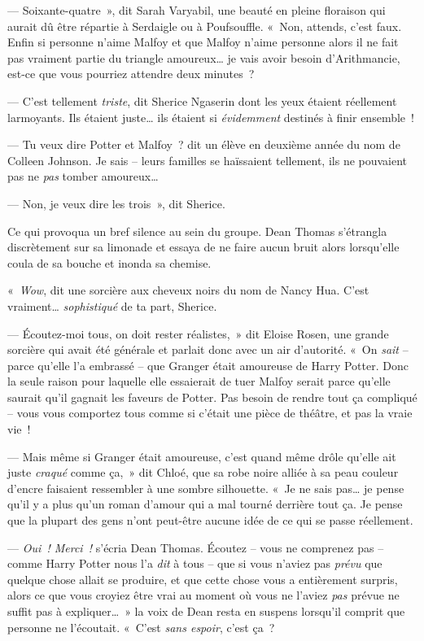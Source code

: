 --- Soixante-quatre~», dit Sarah Varyabil, une beauté en pleine floraison qui aurait dû être répartie à Serdaigle ou à Poufsouffle. «~Non, attends, c'est faux. Enfin si personne n'aime Malfoy et que Malfoy n'aime personne alors il ne fait pas vraiment partie du triangle amoureux… je vais avoir besoin d'Arithmancie, est-ce que vous pourriez attendre deux minutes~?

--- C'est tellement \emph{triste}, dit Sherice Ngaserin dont les yeux étaient réellement larmoyants. Ils étaient juste… ils étaient si \emph{évidemment} destinés à finir ensemble~!

--- Tu veux dire Potter et Malfoy~? dit un élève en deuxième année du nom de Colleen Johnson. Je sais -- leurs familles se haïssaient tellement, ils ne pouvaient pas ne \emph{pas} tomber amoureux…

--- Non, je veux dire les trois~», dit Sherice.

Ce qui provoqua un bref silence au sein du groupe. Dean Thomas s'étrangla discrètement sur sa limonade et essaya de ne faire aucun bruit alors lorsqu'elle coula de sa bouche et inonda sa chemise.

«~\emph{Wow}, dit une sorcière aux cheveux noirs du nom de Nancy Hua. C'est vraiment… \emph{sophistiqué} de ta part, Sherice.

--- Écoutez-moi tous, on doit rester réalistes,~» dit Eloise Rosen, une grande sorcière qui avait été générale et parlait donc avec un air d'autorité. «~On \emph{sait} -- parce qu'elle l'a embrassé -- que Granger était amoureuse de Harry Potter. Donc la seule raison pour laquelle elle essaierait de tuer Malfoy serait parce qu'elle saurait qu'il gagnait les faveurs de Potter. Pas besoin de rendre tout ça compliqué -- vous vous comportez tous comme si c'était une pièce de théâtre, et pas la vraie vie~!

--- Mais même si Granger était amoureuse, c'est quand même drôle qu'elle ait juste \emph{craqué} comme ça,~» dit Chloé, que sa robe noire alliée à sa peau couleur d'encre faisaient ressembler à une sombre silhouette. «~Je ne sais pas… je pense qu'il y a plus qu'un roman d'amour qui a mal tourné derrière tout ça. Je pense que la plupart des gens n'ont peut-être aucune idée de ce qui se passe réellement.

--- \emph{Oui~! Merci~!} s'écria Dean Thomas. Écoutez -- vous ne comprenez pas -- comme Harry Potter nous l'a \emph{dit} à tous -- que si vous n'aviez pas \emph{prévu} que quelque chose allait se produire, et que cette chose vous a entièrement surpris, alors ce que vous croyiez être vrai au moment où vous ne l'aviez \emph{pas} prévue ne suffit pas à expliquer…~» la voix de Dean resta en suspens lorsqu'il comprit que personne ne l'écoutait. «~C'est \emph{sans espoir}, c'est ça~?

